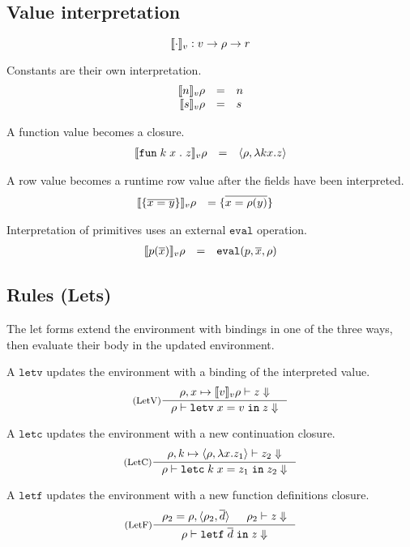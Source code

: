 \documentclass[11pt]{article}
\newcommand{\kw}[1]{\mathtt{#1}}
\begin{document}
\subsection*{Value interpretation}

\[
    \cmpn{v} : v -> \rho -> r
\]

Constants are their own interpretation.
\[
\begin{array}{rlll}
\cmp{v}{\intv{n}}{\rho} & = & n \\
\cmp{v}{\strv{s}}{\rho} & = & s \\
\end{array}
\]

A function value becomes a closure.
\[
\begin{array}{rlll}
\cmp{v}{\funv{k}{x}{z}}{\rho} & = & \clsf{\rho}{k}{x}{z} \\
\end{array}
\]

A row value becomes a runtime row value after the fields have been interpreted.
\[
\begin{array}{rlll}
\cmp{v}{\rowv{x}{y}}{\rho} & = \rowv{x}{\rho(y)} &
\end{array}
\]

Interpretation of primitives uses an external $\kw{eval}$ operation.
\[
\begin{array}{rlll}
\cmp{v}{\prmv{p}{\rep{x}}}{\rho} & = & \kw{eval}(p, \rep{x}, \rho)
\end{array}
\]

\subsection*{Rules (Lets)}

The let forms extend the environment with bindings in one of the three ways, then evaluate their body in the updated environment.

A $\kw{letv}$ updates the environment with a binding of the interpreted value.
\[
\inference[(LetV)]
{\interp{\extv{\rho}{x}{\cmp{v}{v}{\rho}}}{z}}
{\interp{\rho}{\letv{x}{v}{z}}}
\]

A $\kw{letc}$ updates the environment with a new continuation closure.
\[
\inference[(LetC)]
{\interp{\extc{\rho}{k}{\rho}{x}{z_1}}{z_2}}
{\interp{\rho}{\letc{k}{x}{z_1}{z_2}}}
\]

A $\kw{letf}$ updates the environment with a new function definitions closure.
\[
\inference[(LetF)]
{\rho_2 = \extff{\rho}{\rho_2}{d} & \interp{\rho_2}{z}}
{\interp{\rho}{\letf{d}{z}}}
\]
\end{document}
